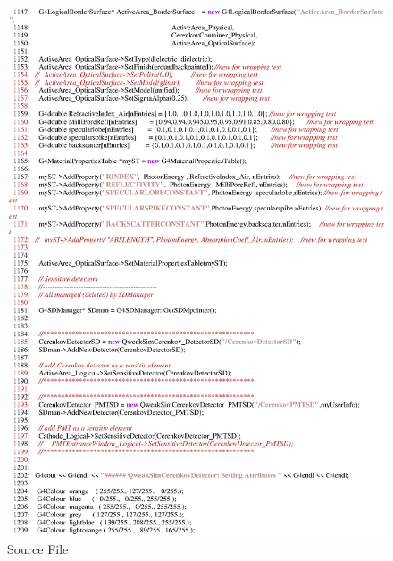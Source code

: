 \begin{figure}[ht]
  \hspace{0cm}
  \includegraphics[scale=0.8]{./figures5/QweakSimCerenkovDetector.cc-p19.eps}
  \caption{\label{SourceV19} Source File}
           \label{fig:V-SC-23}
\end{figure}
\clearpage

